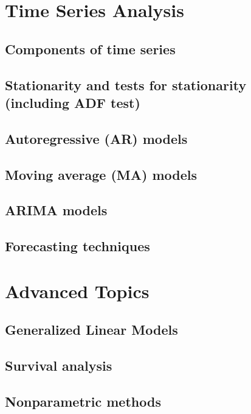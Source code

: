 \documentclass{article}
\begin{document}
\section{Time Series Analysis}

  \subsection{Components of time series}

  \subsection{Stationarity and tests for stationarity (including ADF test)}

  \subsection{Autoregressive (AR) models}

  \subsection{Moving average (MA) models}

  \subsection{ARIMA models}

  \subsection{Forecasting techniques}

\section{Advanced Topics}

  \subsection{Generalized Linear Models}

  \subsection{Survival analysis}

  \subsection{Nonparametric methods}
\end{document}
